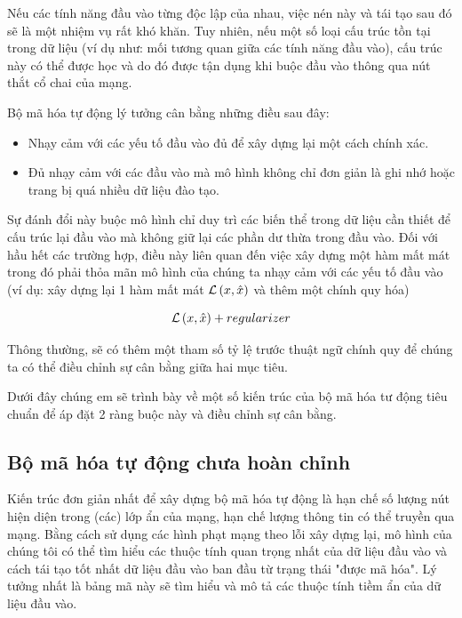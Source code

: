 Nếu các tính năng đầu vào từng độc lập của nhau, việc nén này và tái tạo sau đó sẽ là
một nhiệm vụ rất khó khăn. Tuy nhiên, nếu một số loại cấu trúc tồn tại trong dữ liệu
(ví dụ như: mối tương quan giữa các tính năng đầu vào), cấu trúc này có thể được
học và do đó được tận dụng khi buộc đầu vào thông qua nút thắt cổ chai của mạng.

Bộ mã hóa tự động lý tưởng cân bằng những điều sau đây:
\begin{itemize}[leftmargin=1.5cm]
    \item Nhạy cảm với các yếu tố đầu vào đủ để xây dựng lại một cách chính xác.
    \item Đủ nhạy cảm với các đầu vào mà mô hình không chỉ đơn giản là ghi
          nhớ hoặc trang bị quá nhiều dữ liệu đào tạo.
\end{itemize}

Sự đánh đổi này buộc mô hình chỉ duy trì các biến thể trong dữ liệu cần
thiết để cấu trúc lại đầu vào mà không giữ lại các phần dư thừa trong đầu vào.
Đối với hầu hết các trường hợp, điều này liên quan đến việc xây dựng một hàm mất mát
trong đó phải thỏa mãn mô hình của chúng ta nhạy cảm với các yếu tố đầu vào
(ví dụ: xây dựng lại 1 hàm mất mát ${\cal L}\left( {x,\hat x} \right)$ và
thêm một chính quy hóa)


\begin{equation}
    {\cal L}\left( {x,\hat x} \right) + regularizer
\end{equation}

Thông thường, sẽ có thêm một tham số tỷ lệ trước thuật ngữ chính quy để chúng ta
có thể điều chỉnh sự cân bằng giữa hai mục tiêu.

Dưới đây chúng em sẽ trình bày về một số kiến trúc của bộ mã hóa tư động
tiêu chuẩn để áp đặt 2 ràng buộc này và điều chỉnh sự cân bằng.



\subsection{Bộ mã hóa tự động chưa hoàn chỉnh}

Kiến trúc đơn giản nhất để xây dựng bộ mã hóa tự động là hạn chế số lượng
nút hiện diện trong (các) lớp ẩn của mạng, hạn chế lượng thông tin có
thể truyền qua mạng. Bằng cách sử dụng các hình phạt mạng theo lỗi xây dựng lại,
mô hình của chúng tôi có thể tìm hiểu các thuộc tính quan trọng nhất của dữ
liệu đầu vào và cách tái tạo tốt nhất dữ liệu đầu vào ban đầu từ trạng thái
"được mã hóa". Lý tưởng nhất là bảng mã này sẽ tìm hiểu và mô tả các thuộc
tính tiềm ẩn của dữ liệu đầu vào.

